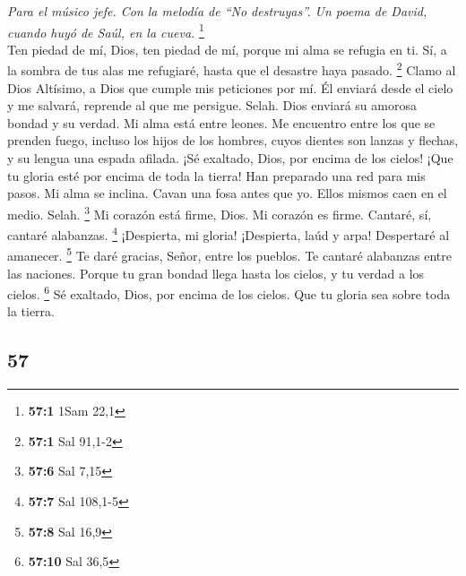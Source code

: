 \begin{paracol}{2}
\emph{Para el músico jefe. Con la melodía de ``No destruyas''. Un poema
de David, cuando huyó de Saúl, en la cueva.} \footnote{\textbf{57:1}
  1Sam 22,1}\\
 Ten piedad de mí, Dios, ten piedad de mí, porque mi alma
se refugia en ti. Sí, a la sombra de tus alas me refugiaré, hasta que el
desastre haya pasado. \footnote{\textbf{57:1} Sal 91,1-2} 
Clamo al Dios Altísimo, a Dios que cumple mis peticiones por mí.
 Él enviará desde el cielo y me salvará, reprende al que
me persigue. Selah. Dios enviará su amorosa bondad y su verdad.
 Mi alma está entre leones. Me encuentro entre los que se
prenden fuego, incluso los hijos de los hombres, cuyos dientes son
lanzas y flechas, y su lengua una espada afilada.  ¡Sé
exaltado, Dios, por encima de los cielos! ¡Que tu gloria esté por encima
de toda la tierra!  Han preparado una red para mis pasos.
Mi alma se inclina. Cavan una fosa antes que yo. Ellos mismos caen en el
medio. Selah. \footnote{\textbf{57:6} Sal 7,15}  Mi
corazón está firme, Dios. Mi corazón es firme. Cantaré, sí, cantaré
alabanzas. \footnote{\textbf{57:7} Sal 108,1-5} 
¡Despierta, mi gloria! ¡Despierta, laúd y arpa! Despertaré al amanecer.
\footnote{\textbf{57:8} Sal 16,9}  Te daré gracias, Señor,
entre los pueblos. Te cantaré alabanzas entre las naciones.
 Porque tu gran bondad llega hasta los cielos, y tu
verdad a los cielos. \footnote{\textbf{57:10} Sal 36,5} 
Sé exaltado, Dios, por encima de los cielos. Que tu gloria sea sobre
toda la tierra.

\switchcolumn
\begin{otherlanguage}{english}

\hypertarget{section-113}{%
\section{57}\label{section-113}}


\end{otherlanguage}
\end{paracol}
